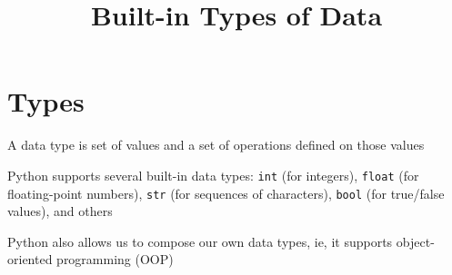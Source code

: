 \documentclass[8pt,a4paper,compress]{beamer}
\title{Built-in Types of Data}
\date{}
\begin{document}
\begin{frame}
\vfill
\titlepage
\end{frame}

\section{Types}
\begin{frame}[fragile]
\pause

A data type is set of values and a set of operations defined on those values

\pause\bigskip

Python supports several built-in data types: \lstinline{int} (for integers), \lstinline{float} (for floating-point numbers), \lstinline{str} (for sequences of characters), \lstinline{bool} (for true/false values), and others

\pause\bigskip

Python also allows us to compose our own data types, ie, it supports object-oriented programming (OOP)
\end{frame}
\end{document}

